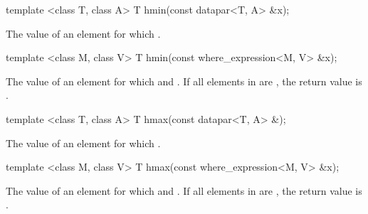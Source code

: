 \begin{itemdecl}
template <class T, class A> T hmin(const datapar<T, A> &x);
\end{itemdecl}
\begin{itemdescr}
  \pnum\returns The value of an element  for which  \foralli.
\end{itemdescr}

\begin{itemdecl}
template <class M, class V> T hmin(const where_expression<M, V> &x);
\end{itemdecl}
\begin{itemdescr}
  \pnum\returns The value of an element  for which  and  \foralli.
  \pnum\remarks If all elements in  are \false, the return value is .
\end{itemdescr}

\begin{itemdecl}
template <class T, class A> T hmax(const datapar<T, A> &);
\end{itemdecl}
\begin{itemdescr}
  \pnum\returns The value of an element  for which  \foralli.
\end{itemdescr}

\begin{itemdecl}
template <class M, class V> T hmax(const where_expression<M, V> &x);
\end{itemdecl}
\begin{itemdescr}
  \pnum\returns The value of an element  for which  and  \foralli.
  \pnum\remarks If all elements in  are \false, the return value is .
\end{itemdescr}


